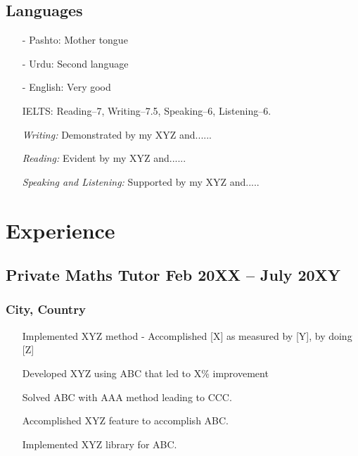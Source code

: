 \documentclass[11pt]{article}
\begin{document}
    \subsection{Languages}
    \begin{itemize}
        \item[-] \textcolor{Sepia}{Pashto}: Mother tongue
        \item[-] \textcolor{Sepia}{Urdu}: Second language
        \item[-] \textcolor{Sepia}{English}: Very good
            \item[\checkmark] IELTS: Reading--7, Writing--7.5, Speaking--6, Listening--6.
            \item[\checkmark] \textit{Writing:}  Demonstrated by my XYZ and......
            \item[\checkmark] \textit{Reading:}  Evident by my XYZ and......
            \item[\checkmark] \textit{Speaking and Listening:} Supported by my XYZ and.....
        \end{itemize}
    
    \section{Experience}
    \subsection{Private Maths Tutor \hfill \normalfont Feb 20XX -- July 20XY}
    \subsubsection{City, Country}
    \begin{itemize}
        \item[\checkmark] Implemented XYZ method - Accomplished [X] as measured by [Y], by doing [Z] 
        \item[\checkmark]  Developed XYZ using ABC that led to X\% improvement 
        \item[\checkmark] Solved ABC with AAA method leading to CCC.
        \item[\checkmark]  Accomplished XYZ feature to accomplish ABC.
        \item[\checkmark]  Implemented XYZ library for ABC.
    \end{itemize}
    
\end{document}
